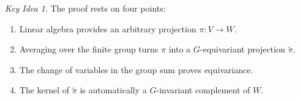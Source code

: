 \documentclass[12pt,a4paper]{article}
\theoremstyle{remark}
\newtheorem*{idea}{Key Idea}
\begin{document}
\begin{idea}
The proof rests on four points:
\begin{enumerate}[label=\arabic*.]
  \item Linear algebra provides an arbitrary projection \(\pi:V\to W\).
  \item Averaging over the finite group turns \(\pi\) into a \(G\)-equivariant
  projection \(\widetilde{\pi}\).
  \item The change of variables in the group sum proves equivariance.
  \item The kernel of \(\widetilde{\pi}\) is automatically a \(G\)-invariant
  complement of \(W\).
\end{enumerate}
\end{idea}
\end{document}
